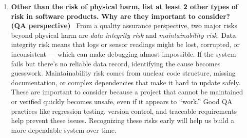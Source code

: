 \documentclass{article}
\begin{document}
\begin{enumerate}
  \item \textbf{Other than the risk of physical harm, list at least 2 other types of risk in software products. Why are they important to consider? (QA perspective)} \
        From a quality assurance perspective, two major risks beyond physical harm are \textit{data integrity risk} and \textit{maintainability risk}. Data integrity risk means that logs or sensor readings might be lost, corrupted, or inconsistent — which can make debugging almost impossible. If the system fails but there’s no reliable data record, identifying the cause becomes guesswork. Maintainability risk comes from unclear code structure, missing documentation, or complex dependencies that make it hard to update safely. These are important to consider because a project that cannot be maintained or verified quickly becomes unsafe, even if it appears to “work.” Good QA practices like regression testing, version control, and traceable requirements help prevent these issues. Recognizing these risks early will help us build a more dependable system over time.
\end{enumerate}
\end{document}
